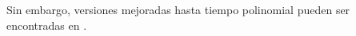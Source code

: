 \documentclass[TFG.tex]{subfiles}
\begin{document}
Sin embargo, versiones mejoradas hasta tiempo polinomial pueden ser encontradas en \cite{polynomial}.




\end{document}
